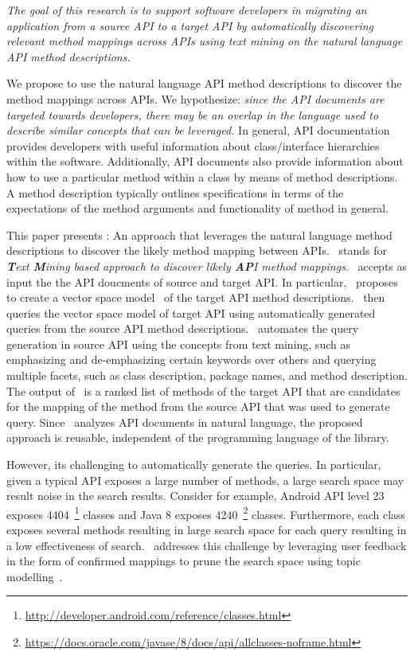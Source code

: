 \textit{The goal of this research is to support software developers 
	in migrating an application from a source API to a target API
	by automatically discovering relevant method mappings across APIs using text mining
	on the natural language API method descriptions.}

We propose to use the natural language API method descriptions
to discover the method mappings across APIs.
We hypothesize:
\textit{since the API documents are targeted towards developers,
	there may be an overlap in the language used to describe similar concepts that can be leveraged.}
In general, API documentation provides developers with useful information
about class/interface hierarchies within the software.
Additionally, API documents also provide information about
how to use a particular method within a class by means of method descriptions.
A method description typically outlines specifications in terms of
the expectations of the method arguments and functionality of method in general.


This paper presents \tool : An approach that leverages the natural language method descriptions to discover the likely method mapping between APIs.
\tool\ stands for \textit{\textbf{T}ext \textbf{M}ining
	based approach to discover likely \textbf{AP}I method mappings}.
\tool\ accepts as input the the API doucments of source and target API.
In particular, \tool\ proposes to create a vector space model~\cite{singhal2001modern,manning2008introduction} of the target API method descriptions. 
\tool\ then queries the vector space model of target API using
automatically generated queries from the source API method descriptions.
\tool\ automates the query generation in source API using the concepts from text mining, such as emphasizing and de-emphasizing certain keywords over others and querying multiple facets, such as class description, package names, and method description.
The output of \tool\ is a ranked list of methods of the target API that are candidates for the mapping of the method from the source API that was used to generate query.
Since \tool\ analyzes API documents in natural language, the proposed approach is reusable, independent of the programming language of the library.


However, its challenging to automatically generate the queries. In particular, given a typical API exposes a large number of methods, a large search space may result noise in the search results.
Consider for example, Android API level 23 exposes 4404~\footnote{\url{http://developer.android.com/reference/classes.html}} classes
and Java 8 exposes 4240~\footnote{\url{https://docs.oracle.com/javase/8/docs/api/allclasses-noframe.html}} classes.
Furthermore, each class exposes several methods resulting in large search space for each query resulting in a low effectiveness of search. 
\tool\ addresses this challenge by leveraging user feedback in the form of confirmed mappings to prune the search space using topic modelling~\cite{blei2003latent,panichella2013effectively}. 


